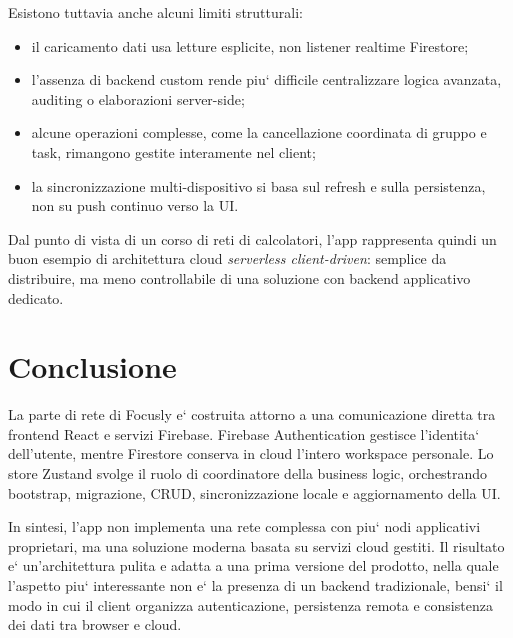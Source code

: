 \documentclass[11pt,a4paper]{article}
\begin{document}
Esistono tuttavia anche alcuni limiti strutturali:

\begin{itemize}
  \item il caricamento dati usa letture esplicite, non listener realtime Firestore;
  \item l'assenza di backend custom rende piu` difficile centralizzare logica avanzata, auditing o elaborazioni server-side;
  \item alcune operazioni complesse, come la cancellazione coordinata di gruppo e task, rimangono gestite interamente nel client;
  \item la sincronizzazione multi-dispositivo si basa sul refresh e sulla persistenza, non su push continuo verso la UI.
\end{itemize}

Dal punto di vista di un corso di reti di calcolatori, l'app rappresenta quindi un buon esempio di architettura cloud \emph{serverless client-driven}: semplice da distribuire, ma meno controllabile di una soluzione con backend applicativo dedicato.

\section{Conclusione}

La parte di rete di Focusly e` costruita attorno a una comunicazione diretta tra frontend React e servizi Firebase. Firebase Authentication gestisce l'identita` dell'utente, mentre Firestore conserva in cloud l'intero workspace personale. Lo store Zustand svolge il ruolo di coordinatore della business logic, orchestrando bootstrap, migrazione, CRUD, sincronizzazione locale e aggiornamento della UI.

In sintesi, l'app non implementa una rete complessa con piu` nodi applicativi proprietari, ma una soluzione moderna basata su servizi cloud gestiti. Il risultato e` un'architettura pulita e adatta a una prima versione del prodotto, nella quale l'aspetto piu` interessante non e` la presenza di un backend tradizionale, bensi` il modo in cui il client organizza autenticazione, persistenza remota e consistenza dei dati tra browser e cloud.
\end{document}
